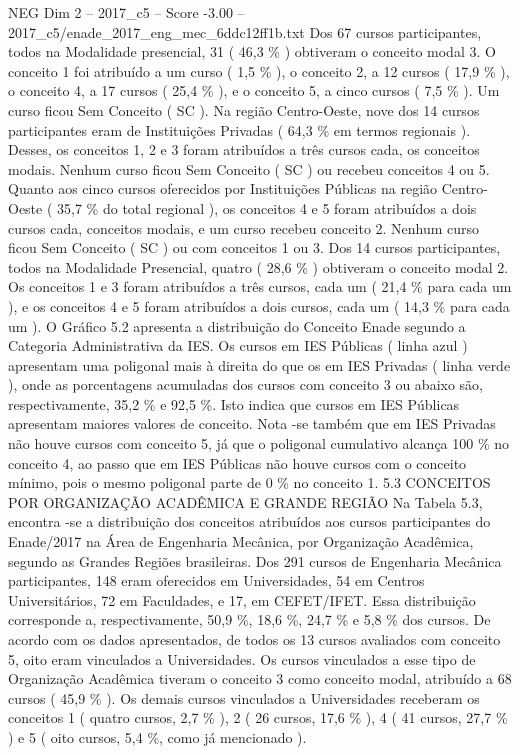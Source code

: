 \begin{textsample}{NEG Dim 2 – 2017\_c5 – Score -3.00 – 2017\_c5/enade\_2017\_eng\_mec\_6ddc12ff1b.txt}
Dos 67 cursos participantes, todos na Modalidade presencial, 31 ( 46,3 \% ) obtiveram o conceito modal 3.
O conceito 1 foi atribuído a um curso ( 1,5 \% ), o conceito 2, a 12 cursos ( 17,9 \% ), o conceito 4, a 17 cursos ( 25,4 \% ), e o conceito 5, a cinco cursos ( 7,5 \% ).
Um curso ficou Sem Conceito ( SC ).
Na região Centro-Oeste, nove dos 14 cursos participantes eram de Instituições Privadas ( 64,3 \% em termos regionais ).
Desses, os conceitos 1, 2 e 3 foram atribuídos a três cursos cada, os conceitos modais.
Nenhum curso ficou Sem Conceito ( SC ) ou recebeu conceitos 4 ou 5.
Quanto aos cinco cursos oferecidos por Instituições Públicas na região Centro-Oeste ( 35,7 \% do total regional ), os conceitos 4 e 5 foram atribuídos a dois cursos cada, conceitos modais, e um curso recebeu conceito 2.
Nenhum curso ficou Sem Conceito ( SC ) ou com conceitos 1 ou 3.
Dos 14 cursos participantes, todos na Modalidade Presencial, quatro ( 28,6 \% ) obtiveram o conceito modal 2.
Os conceitos 1 e 3 foram atribuídos a três cursos, cada um ( 21,4 \% para cada um ), e os conceitos 4 e 5 foram atribuídos a dois cursos, cada um ( 14,3 \% para cada um ).
O Gráfico 5.2 apresenta a distribuição do Conceito Enade segundo a Categoria Administrativa da IES.
Os cursos em IES Públicas ( linha azul ) apresentam uma poligonal mais à direita do que os em IES Privadas ( linha verde ), onde as porcentagens acumuladas dos cursos com conceito 3 ou abaixo são, respectivamente, 35,2 \% e 92,5 \%.
Isto indica que cursos em IES Públicas apresentam maiores valores de conceito.
Nota -se também que em IES Privadas não houve cursos com conceito 5, já que o poligonal cumulativo alcança 100 \% no conceito 4, ao passo que em IES Públicas não houve cursos com o conceito mínimo, pois o mesmo poligonal parte de 0 \% no conceito 1. 5.3 CONCEITOS POR ORGANIZAÇÃO ACADÊMICA E GRANDE REGIÃO Na Tabela 5.3, encontra -se a distribuição dos conceitos atribuídos aos cursos participantes do Enade/2017 na Área de Engenharia Mecânica, por Organização Acadêmica, segundo as Grandes Regiões brasileiras.
Dos 291 cursos de Engenharia Mecânica participantes, 148 eram oferecidos em Universidades, 54 em Centros Universitários, 72 em Faculdades, e 17, em CEFET/IFET.
Essa distribuição corresponde a, respectivamente, 50,9 \%, 18,6 \%, 24,7 \% e 5,8 \% dos cursos.
De acordo com os dados apresentados, de todos os 13 cursos avaliados com conceito 5, oito eram vinculados a Universidades.
Os cursos vinculados a esse tipo de Organização Acadêmica tiveram o conceito 3 como conceito modal, atribuído a 68 cursos ( 45,9 \% ).
Os demais cursos vinculados a Universidades receberam os conceitos 1 ( quatro cursos, 2,7 \% ), 2 ( 26 cursos, 17,6 \% ), 4 ( 41 cursos, 27,7 \% ) e 5 ( oito cursos, 5,4 \%, como já mencionado ).

\end{textsample}
